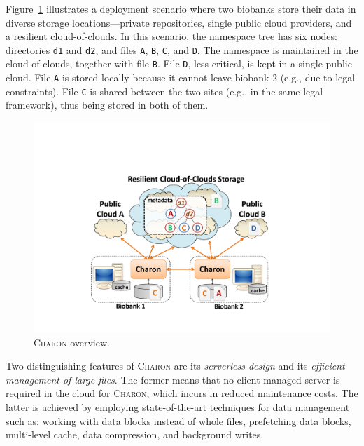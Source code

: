 Figure~\ref{fig:charon} illustrates a deployment scenario where two biobanks store their data in diverse storage locations---private repositories, single public cloud providers, and a resilient cloud-of-clouds.
In this scenario, the namespace tree has six nodes: directories \texttt{d1} and \texttt{d2}, and files \texttt{A}, \texttt{B}, \texttt{C}, and \texttt{D}.
The namespace is maintained in the cloud-of-clouds, together with file \texttt{B}.
File \texttt{D}, less critical, is kept in a single public cloud.
File \texttt{A} is stored locally because it cannot leave biobank 2 (e.g., due to legal constraints).
File \texttt{C} is shared between the two sites (e.g., in the same legal framework), thus being stored in both of them.

\begin{figure}[ht]
 \centering
 \includegraphics[width=0.6\columnwidth]{./imgs/charon_arch.pdf}
\caption{\small \textsc{Charon} overview.}
\label{fig:charon}
\end{figure}

Two distinguishing features of \textsc{Charon} are its \emph{serverless design} and its \emph{efficient management of large files}.
The former means that no client-managed server is required in the cloud for \textsc{Charon}, which incurs in reduced maintenance costs.
The latter is achieved by employing state-of-the-art techniques for data management such as: working with data blocks instead of whole files, prefetching data blocks, multi-level cache, data compression, and background writes.
